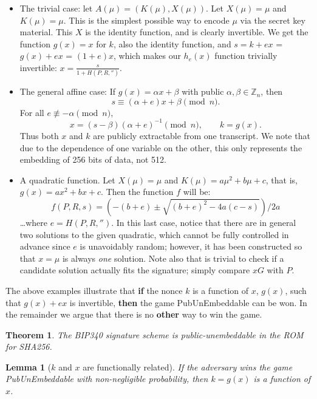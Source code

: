 \documentclass[10pt,a4paper]{article}
\newtheorem{theorem}{Theorem}
\newtheorem{lemma}{Lemma}       %
\theoremstyle{definition}   %
\theoremstyle{remark}       %
\begin{document}
\begin{itemize}
\item The trivial case: let $A(\mu) = (K(\mu), X(\mu))$. Let $X(\mu) = \mu$ and $K(\mu) = \mu$. This is the simplest possible way to encode $\mu$ via the secret key material. This $X$ is the identity function, and is clearly invertible. We get the function $g(x) = x$ for $k$, also the identity function, and $s = k + ex$ = $g(x) + ex$ = $(1+e)x$, which makes our $h_e(x)$ function trivially invertible: $x = \frac{s}{1 + H(P, R, '')}$.
\item The general affine case: If $g(x)=\alpha x+\beta$ with public $\alpha,\beta\in\mathbb{Z}_n$, then
\[
s \equiv (\alpha+e)x + \beta \pmod n.
\]
For all $e\not\equiv -\alpha \pmod n$,
\[
x = (s-\beta)(\alpha+e)^{-1}\pmod n,\qquad k=g(x).
\]
Thus both $x$ and $k$ are publicly extractable from one transcript. We note that due to the dependence of one variable on the other, this only represents the embedding of 256 bits of data, not 512.
\item A quadratic function. Let $X(\mu) = \mu$ and $K(\mu) = a\mu^2 + b\mu + c$, that is, $g(x) = ax^2 + bx+ c$. Then the function $f$ will be:
\[
f(P, R, s) = \left(-(b+e) \pm \sqrt{(b+e)^2 - 4a(c-s)}\right)/2a
\]
\ldots where $e = H(P, R, '')$. In this last case, notice that there are in general two solutions to the given quadratic, which cannot be fully controlled in advance since $e$ is unavoidably random; however, it has been constructed so that $x=\mu$ is always \emph{one} solution. Note also that is trivial to check if a candidate solution actually fits the signature; simply compare $xG$ with $P$.
\end{itemize}

The above examples illustrate that \textbf{if} the nonce $k$ is a function of $x$, $g(x)$, such that $g(x) + ex$ is invertible, \textbf{then} the game PubUnEmbeddable can be won. In the remainder we argue that there is no \textbf{other} way to win the game.

\begin{theorem}
\label{thm:pubunembedthm}
The BIP340 signature scheme is public-unembeddable in the ROM for SHA256.
\end{theorem}

\begin{lemma}[$k$ and $x$ are functionally related]
\label{lem:kxrelated}
If the adversary wins the game PubUnEmbeddable with non-negligible probability, then $k = g(x)$ is a function of $x$.
\end{lemma}
\end{document}
